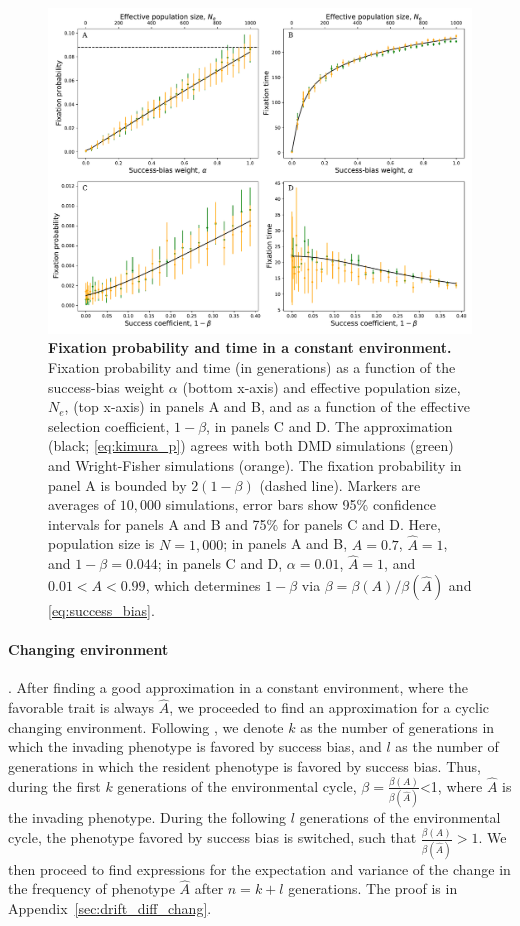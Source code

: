 \documentclass[12pt]{extarticle}
\begin{document}
\begin{figure}[h]
    \includegraphics[width=\linewidth]{kimura_var.pdf}
  \caption{\textbf{Fixation probability and time in a constant environment.}
  Fixation probability and time (in generations) as a function of the success-bias weight $\alpha$ (bottom x-axis) and effective population size, $N_e$, (top x-axis) in panels A and B, and as a function of the effective selection coefficient, $1-\beta$, in panels C and D.
  The approximation (black; \cref{eq:kimura_p}) agrees with both DMD simulations (green) and Wright-Fisher simulations (orange).
  The fixation probability in panel A is bounded by $2(1-\beta)$ (dashed line).
  Markers are averages of $10,000$ simulations, error bars show 95\% confidence intervals for panels A and B and 75\% for panels C and D.
   Here, population size is $N=1,000$; in panels A and B, $A=0.7$, $\hat{A}=1$, and $1-\beta=0.044$; in panels C and D, $\alpha=0.01$, $\hat{A}=1$, and $0.01 < A< 0.99$, which determines $1-\beta$ via $\beta = \beta(A)/\beta(\hat{A})$ and \cref{eq:success_bias}.
   }
  \label{fig:var_alpha}
\end{figure}


\paragraph*{Changing environment}. After finding a good approximation in a constant environment, where the favorable trait is always $\hat{A}$, we proceeded to find an approximation for a cyclic changing environment. 
Following \citep{changeEnv}, we denote $k$ as the number of generations in which the invading phenotype is favored by success bias, and $l$ as the number of generations in which the resident phenotype is favored by success bias.
Thus, during the first $k$ generations of the environmental cycle, $\beta=\frac{\beta(A)}{\beta(\hat{A})}$<1, where $\hat{A}$ is the invading phenotype. During the following $l$ generations of the environmental cycle, the phenotype favored by success bias is switched, such that $\frac{\beta(A)}{\beta(\hat{A})}>1$.
We then proceed to find expressions for the expectation and variance of the change in the frequency of phenotype $\hat{A}$ after $n=k+l$ generations. 
The proof is in Appendix~\ref{sec:drift_diff_chang}.
\\
\end{document}

